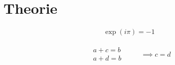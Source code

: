 \section{Theorie} 

    \begin{align}
        \exp(i \pi) = -1
    \end{align}
    
    \begin{align}
        \begin{aligned}
            & a + c = b \\
            & a +d = b 
        \end{aligned}
        \qquad
        \begin{aligned}
            \implies c = d
        \end{aligned}
    \end{align}